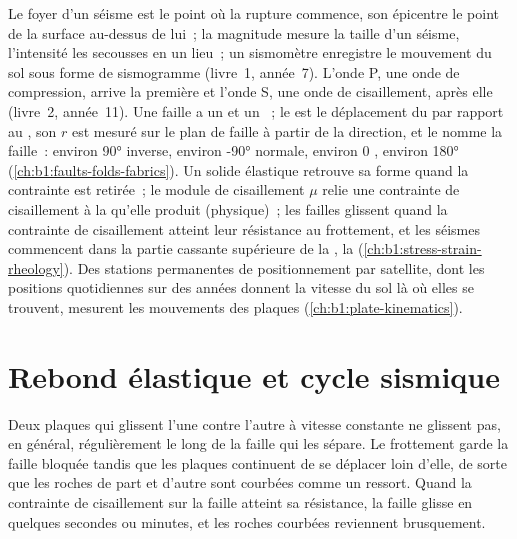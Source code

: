\begin{recall}
Le foyer d'un séisme est le point où la rupture commence, son
épicentre le point de la surface au-dessus de lui~; la magnitude mesure la taille
d'un séisme, l'intensité les secousses en un lieu~; un sismomètre enregistre
le mouvement du sol sous forme de sismogramme (livre~1, année~7). L'onde P, une
onde de compression, arrive la première et l'onde S, une onde de cisaillement, après elle
(livre~2, année~11). Une faille a un  et un ~; le 
est le déplacement du  par rapport au , son 
$r$ est mesuré sur le plan de faille à partir de la direction, et le  nomme la
faille~: environ \ang{90} inverse, environ \ang{-90} normale, environ 0 , environ
\ang{180}  (\cref{ch:b1:faults-folds-fabrics}). Un solide élastique
retrouve sa forme quand la contrainte est retirée~; le module de cisaillement $\mu$
relie une contrainte de cisaillement à la  qu'elle produit (physique)~; les failles glissent
quand la contrainte de cisaillement atteint leur résistance au frottement, et les séismes
commencent dans la partie cassante supérieure de la , la 
(\cref{ch:b1:stress-strain-rheology}). Des stations permanentes de positionnement par satellite,
dont les positions quotidiennes sur des années donnent la vitesse du sol là où elles
se trouvent, mesurent les mouvements des plaques (\cref{ch:b1:plate-kinematics}).
\end{recall}

\section{Rebond élastique et cycle sismique}\label{sec:b1:earthquake-source:cycle}

Deux plaques qui glissent l'une contre l'autre à vitesse constante ne glissent pas, en général,
régulièrement le long de la faille qui les sépare. Le frottement garde la faille bloquée
tandis que les plaques continuent de se déplacer loin d'elle, de sorte que les roches de part et d'autre sont
courbées comme un ressort. Quand la contrainte de cisaillement sur la faille atteint sa résistance,
la faille glisse en quelques secondes ou minutes, et les roches courbées reviennent brusquement.

